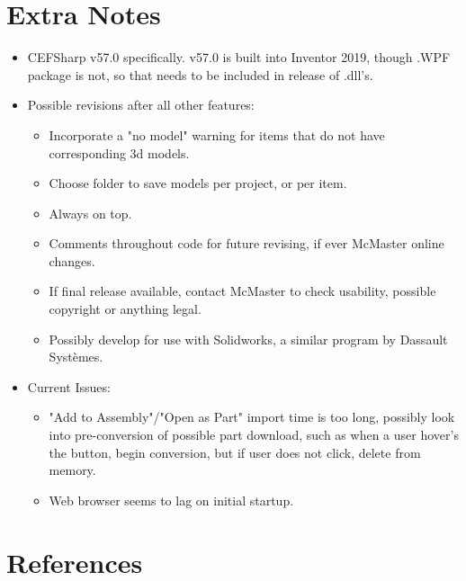 \documentclass[12pt, letterpaper]{article}
\begin{document}
\section{Extra Notes}
\begin{itemize}
    \item CEFSharp v57.0 specifically. v57.0 is built into Inventor 2019, though .WPF package is not, so that needs to be included in release of .dll's.
    \item Possible revisions after all other features:
    \begin{itemize}
        \item Incorporate a "no model" warning for items that do not have corresponding 3d models.
        \item Choose folder to save models per project, or per item.
        \item Always on top.
        \item Comments throughout code for future revising, if ever McMaster online changes.
        \item If final release available, contact McMaster to check usability, possible copyright or anything legal. 
        \item Possibly develop for use with Solidworks, a similar program by  Dassault Systèmes.
    \end{itemize}
    \item Current Issues:
    \begin{itemize}
        \item "Add to Assembly"/"Open as Part" import time is too long, possibly look into 
        pre-conversion of possible part download, such as when a user hover's the button, begin conversion,
        but if user does not click, delete from memory.
        \item Web browser seems to lag on initial startup.
    \end{itemize}
\end{itemize}
\section{References}
\begingroup
\renewcommand{\section}[2]{}


\endgroup
\newpage
\end{document}
